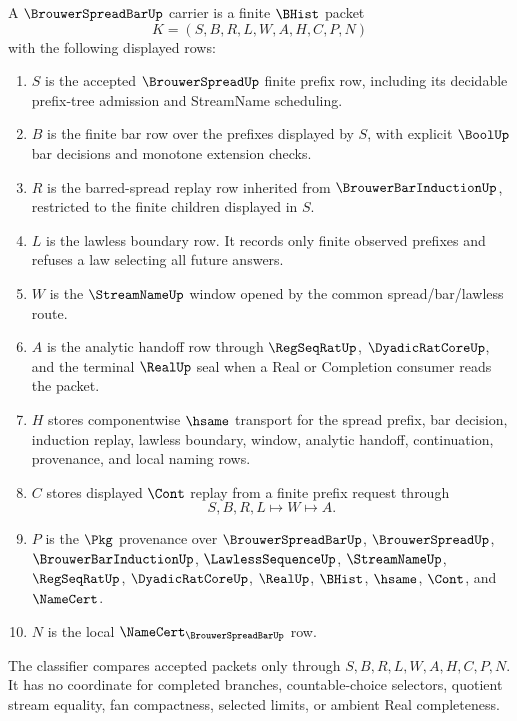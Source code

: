 \begin{definition}
\label{def:brouwer-spread-bar-carrier}
A $\BrouwerSpreadBarUp$ carrier is a finite $\BHist$ packet
$$
K=(S,B,R,L,W,A,H,C,P,N)
$$
with the following displayed rows:
\begin{enumerate}
\item $S$ is the accepted $\BrouwerSpreadUp$ finite prefix row, including its decidable prefix-tree admission and StreamName scheduling.
\item $B$ is the finite bar row over the prefixes displayed by $S$, with explicit $\BoolUp$ bar decisions and monotone extension checks.
\item $R$ is the barred-spread replay row inherited from $\BrouwerBarInductionUp$, restricted to the finite children displayed in $S$.
\item $L$ is the lawless boundary row. It records only finite observed prefixes and refuses a law selecting all future answers.
\item $W$ is the $\StreamNameUp$ window opened by the common spread/bar/lawless route.
\item $A$ is the analytic handoff row through $\RegSeqRatUp$, $\DyadicRatCoreUp$, and the terminal $\RealUp$ seal when a Real or Completion consumer reads the packet.
\item $H$ stores componentwise $\hsame$ transport for the spread prefix, bar decision, induction replay, lawless boundary, window, analytic handoff, continuation, provenance, and local naming rows.
\item $C$ stores displayed $\Cont$ replay from a finite prefix request through
$$
S,B,R,L \longmapsto W \longmapsto A .
$$
\item $P$ is the $\Pkg$ provenance over $\BrouwerSpreadBarUp$, $\BrouwerSpreadUp$, $\BrouwerBarInductionUp$, $\LawlessSequenceUp$, $\StreamNameUp$, $\RegSeqRatUp$, $\DyadicRatCoreUp$, $\RealUp$, $\BHist$, $\hsame$, $\Cont$, and $\NameCert$.
\item $N$ is the local $\NameCert_{\BrouwerSpreadBarUp}$ row.
\end{enumerate}
The classifier compares accepted packets only through $S,B,R,L,W,A,H,C,P,N$. It has no coordinate for completed branches, countable-choice selectors, quotient stream equality, fan compactness, selected limits, or ambient Real completeness.
\end{definition}

